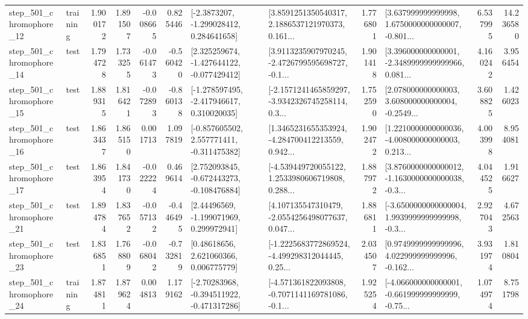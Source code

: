 \begin{tabular}{llrrrrllrlrr}
  step\_501\_chromophore\_12 &  training &      1.900172 &    1.891507 &     -0.008665 &  0.825446 &     [-2.3873207, -1.299028412, 0.284641658] &  [3.8591251350540317, 2.1886537121970373, 0.161... &       1.776801 &  [3.637999999999998, 1.6750000000000007, -0.801... &            6.537995 &         14.236580 \\
  step\_501\_chromophore\_14 &      test &      1.794728 &    1.733255 &     -0.061473 & -0.560420 &   [2.325259674, -1.427644122, -0.077429412] &  [3.9113235907970245, -2.4726799595698727, -0.1... &       1.901418 &  [3.396000000000001, -2.3489999999999966, 0.081... &            4.160242 &          3.956454 \\
  step\_501\_chromophore\_15 &      test &      1.889315 &    1.816421 &     -0.072893 & -0.860138 &   [-1.278597495, -2.417946617, 0.310020035] &  [-2.1571241465859297, -3.9342326745258114, 0.3... &       1.752590 &  [2.078000000000003, 3.608000000000004, -0.2549... &            3.608825 &          1.426023 \\
  step\_501\_chromophore\_16 &      test &      1.863437 &    1.865150 &      0.001713 &  1.097819 &   [-0.857605502, 2.557771411, -0.311475382] &  [1.3465231655353924, -4.284700412213559, 0.942... &       1.902472 &  [1.2210000000000036, -4.008000000000003, 0.213... &            4.003998 &          8.954081 \\
  step\_501\_chromophore\_17 &      test &      1.863954 &    1.841730 &     -0.022224 &  0.469614 &   [2.752093845, -0.672443273, -0.108476884] &  [-4.539449720055122, 1.2533980606719808, 0.288... &       1.887972 &  [3.8760000000000012, -1.1630000000000038, -0.3... &            4.044525 &          1.916627 \\
  step\_501\_chromophore\_21 &      test &      1.894784 &    1.837652 &     -0.057132 & -0.446495 &     [2.44496569, -1.199071969, 0.299972941] &  [4.107135547310479, -2.0554256498077637, 0.047... &       1.886811 &  [-3.6500000000000004, 1.9939999999999998, -0.3... &            2.927043 &          4.672563 \\
  step\_501\_chromophore\_23 &      test &      1.836851 &    1.768809 &     -0.068042 & -0.732819 &      [0.48618656, 2.621060366, 0.006775779] &  [-1.2225683772869524, -4.499298312044445, 0.25... &       2.034507 &  [0.9749999999999996, 4.022999999999996, -0.162... &            3.931974 &          1.810804 \\
  step\_501\_chromophore\_24 &  training &      1.874811 &    1.879624 &      0.004813 &  1.179162 &   [-2.70283968, -0.394511922, -0.471317286] &  [-4.571361822093808, -0.7071141169781086, -0.1... &       1.925254 &  [-4.066000000000001, -0.661999999999999, -0.75... &            1.074974 &          8.751798 \\

\end{tabular}
